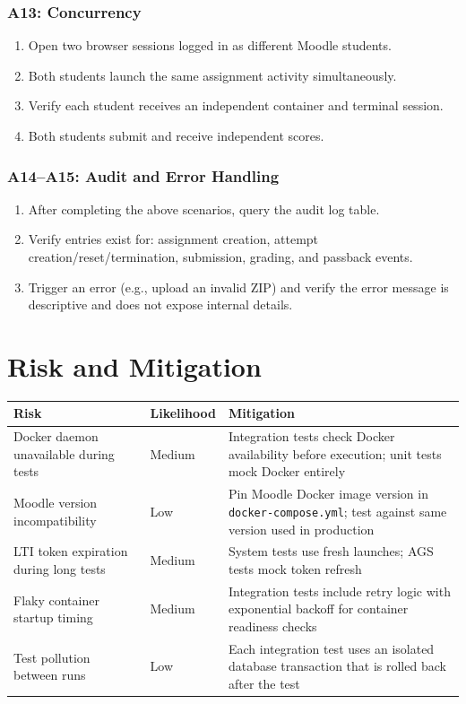 \documentclass[12pt, letterpaper]{article}
\begin{document}
\subsubsection{A13: Concurrency}

\begin{enumerate}
    \item Open two browser sessions logged in as different Moodle students.
    \item Both students launch the same assignment activity simultaneously.
    \item Verify each student receives an independent container and terminal session.
    \item Both students submit and receive independent scores.
\end{enumerate}

\subsubsection{A14--A15: Audit and Error Handling}

\begin{enumerate}
    \item After completing the above scenarios, query the audit log table.
    \item Verify entries exist for: assignment creation, attempt creation/reset/termination, submission, grading, and passback events.
    \item Trigger an error (e.g., upload an invalid ZIP) and verify the error message is descriptive and does not expose internal details.
\end{enumerate}

\section{Risk and Mitigation}

\begin{longtable}{p{4cm} p{3cm} p{6.5cm}}
    \toprule
    \textbf{Risk} & \textbf{Likelihood} & \textbf{Mitigation} \\
    \midrule
    Docker daemon unavailable during tests & Medium & Integration tests check Docker availability before execution; unit tests mock Docker entirely \\
    Moodle version incompatibility & Low & Pin Moodle Docker image version in \texttt{docker-compose.yml}; test against same version used in production \\
    LTI token expiration during long tests & Medium & System tests use fresh launches; AGS tests mock token refresh \\
    Flaky container startup timing & Medium & Integration tests include retry logic with exponential backoff for container readiness checks \\
    Test pollution between runs & Low & Each integration test uses an isolated database transaction that is rolled back after the test \\
    \bottomrule
\end{longtable}
\end{document}
